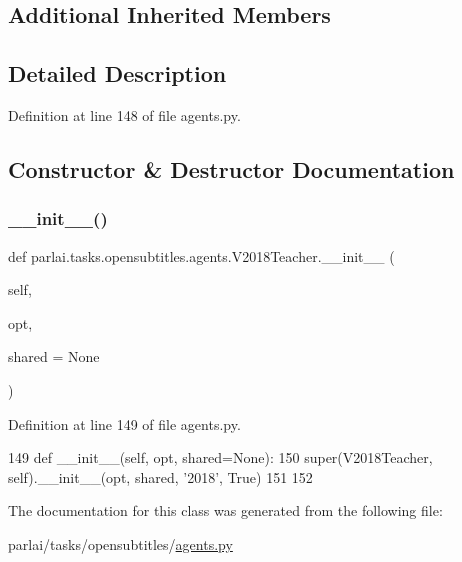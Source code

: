 \subsection*{Additional Inherited Members}


\subsection{Detailed Description}


Definition at line 148 of file agents.\+py.



\subsection{Constructor \& Destructor Documentation}
\mbox{\label{classparlai_1_1tasks_1_1opensubtitles_1_1agents_1_1V2018Teacher_a10803c76b3b6467a673659099d90d777}} 
\subsubsection{\texorpdfstring{\+\_\+\+\_\+init\+\_\+\+\_\+()}{\_\_init\_\_()}}
{\footnotesize\ttfamily def parlai.\+tasks.\+opensubtitles.\+agents.\+V2018\+Teacher.\+\_\+\+\_\+init\+\_\+\+\_\+ (\begin{DoxyParamCaption}\item[{}]{self,  }\item[{}]{opt,  }\item[{}]{shared = {\ttfamily None} }\end{DoxyParamCaption})}



Definition at line 149 of file agents.\+py.


\begin{DoxyCode}
149     \textcolor{keyword}{def }\_\_init\_\_(self, opt, shared=None):
150         super(V2018Teacher, self).\_\_init\_\_(opt, shared, \textcolor{stringliteral}{'2018'}, \textcolor{keyword}{True})
151 
152 
\end{DoxyCode}


The documentation for this class was generated from the following file\+:\begin{DoxyCompactItemize}
\item 
parlai/tasks/opensubtitles/\hyperlink{parlai_2tasks_2opensubtitles_2agents_8py}{agents.\+py}\end{DoxyCompactItemize}
